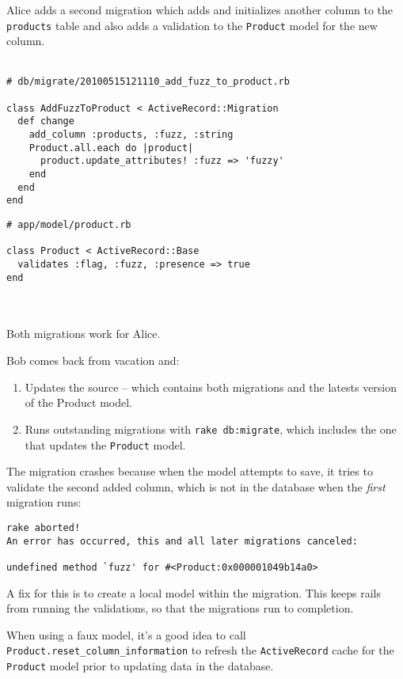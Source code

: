 \documentclass[10pt]{book}
\begin{document}
Alice adds a second migration which adds and initializes another column to the \texttt{products} table and also adds a validation to the \texttt{Product} model for the new column.
\\ \\
\begin{minipage}{\textwidth}
\begin{verbatim}
# db/migrate/20100515121110_add_fuzz_to_product.rb
 
class AddFuzzToProduct < ActiveRecord::Migration
  def change
    add_column :products, :fuzz, :string
    Product.all.each do |product|
      product.update_attributes! :fuzz => 'fuzzy'
    end
  end
end
\end{verbatim}

\begin{verbatim}
# app/model/product.rb
 
class Product < ActiveRecord::Base
  validates :flag, :fuzz, :presence => true
end
\end{verbatim}
\end{minipage}
\\ \\


Both migrations work for Alice.

Bob comes back from vacation and:
\begin{enumerate}
	\item Updates the source – which contains both migrations and the latests version of the Product model.
	\item Runs outstanding migrations with \texttt{rake db:migrate}, which includes the one that updates the \texttt{Product} model.
\end{enumerate}

The migration crashes because when the model attempts to save, it tries to validate the second added column, which is not in the database when the \emph{first} migration runs:
\begin{verbatim}
rake aborted!
An error has occurred, this and all later migrations canceled:
 
undefined method `fuzz' for #<Product:0x000001049b14a0>
\end{verbatim}

A fix for this is to create a local model within the migration. This keeps rails from running the validations, so that the migrations run to completion.

When using a faux model, it’s a good idea to call \texttt{Product.reset\_column\_information} to refresh the \texttt{ActiveRecord} cache for the \texttt{Product} model prior to updating data in the database.
\end{document}
